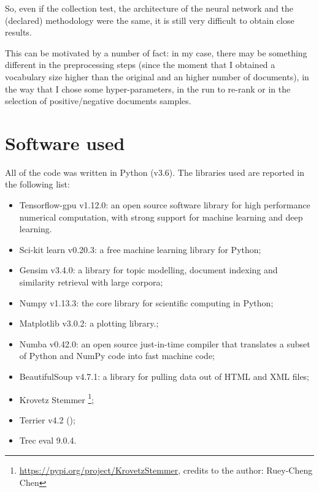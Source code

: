 So, even if the collection test, the architecture of the neural network and the (declared) methodology were the same, it is still very difficult to obtain close results.

This can be motivated by a number of fact: in my case, there may be something different in the preprocessing steps (since the moment that I obtained a vocabulary size higher than the original and an higher number of documents), in the way that I chose some hyper-parameters, in the run to re-rank or in the selection of positive/negative documents samples.

\section{Software used}

All of the code was written in Python (v3.6). The libraries used are reported in the following list:

\begin{itemize}
 \item Tensorflow-gpu v1.12.0: an open source software library for high performance numerical computation, with strong support for machine learning and deep learning.
 \item Sci-kit learn v0.20.3: a free machine learning library for Python;
 \item Gensim v3.4.0: a library for topic modelling, document indexing and similarity retrieval with large corpora;
 \item Numpy v1.13.3: the core library for scientific computing in Python;
 \item Matplotlib v3.0.2: a plotting library.;
 \item Numba v0.42.0: an open source just-in-time compiler that translates a subset of Python and NumPy code into fast machine code;
 \item BeautifulSoup v4.7.1: a library for pulling data out of HTML and XML files;
 \item Krovetz Stemmer \footnote{\url{https://pypi.org/project/KrovetzStemmer}, credits to the author: Ruey-Cheng Chen};
 \item Terrier v4.2 (\cite{terrier});
 \item Trec eval 9.0.4.
\end{itemize}
